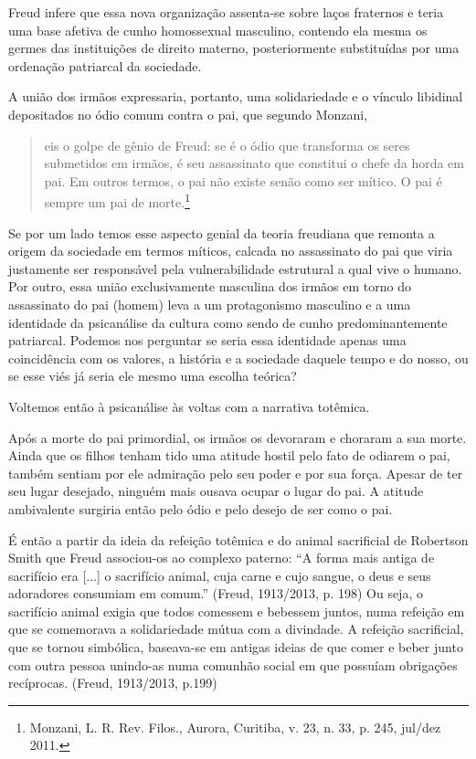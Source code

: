 Freud infere que essa nova organização assenta-se sobre laços fraternos
e teria uma base afetiva de cunho homossexual masculino, contendo ela
mesma os germes das instituições de direito materno, posteriormente
substituídas por uma ordenação patriarcal da sociedade.

A união dos irmãos expressaria, portanto, uma solidariedade e o vínculo
libidinal depositados no ódio comum contra o pai, que segundo Monzani,

\begin{quote}
eis o golpe de gênio de Freud: se é o ódio que transforma os seres
submetidos em irmãos, é seu assassinato que constitui o chefe da horda
em pai. Em outros termos, o pai não existe senão como ser mítico. O pai
é sempre um pai de morte.\footnote{Monzani, L. R. Rev. Filos., Aurora,
  Curitiba, v. 23, n. 33, p. 245, jul/dez 2011.}
\end{quote}

Se por um lado temos esse aspecto genial da teoria freudiana que remonta
a origem da sociedade em termos míticos, calcada no assassinato do pai
que viria justamente ser responsável pela vulnerabilidade estrutural a
qual vive o humano. Por outro, essa união exclusivamente masculina dos
irmãos em torno do assassinato do pai (homem) leva a um protagonismo
masculino e a uma identidade da psicanálise da cultura como sendo de
cunho predominantemente patriarcal. Podemos nos perguntar se seria essa
identidade apenas uma coincidência com os valores, a história e a
sociedade daquele tempo e do nosso, ou se esse viés já seria ele mesmo
uma escolha teórica?

Voltemos então à psicanálise às voltas com a narrativa totêmica.

Após a morte do pai primordial, os irmãos os devoraram e choraram a sua
morte. Ainda que os filhos tenham tido uma atitude hostil pelo fato de
odiarem o pai, também sentiam por ele admiração pelo seu poder e por sua
força. Apesar de ter seu lugar desejado, ninguém mais ousava ocupar o
lugar do pai. A atitude ambivalente surgiria então pelo ódio e pelo
desejo de ser como o pai.

É então a partir da ideia da refeição totêmica e do animal sacrificial
de Robertson Smith que Freud associou-os ao complexo paterno: ``A forma
mais antiga de sacrifício era {[}...{]} o sacrifício animal, cuja carne
e cujo sangue, o deus e seus adoradores consumiam em comum.'' (Freud,
1913/2013, p. 198) Ou seja, o sacrifício animal exigia que todos
comessem e bebessem juntos, numa refeição em que se comemorava a
solidariedade mútua com a divindade. A refeição sacrificial, que se
tornou simbólica, baseava-se em antigas ideias de que comer e beber
junto com outra pessoa unindo-as numa comunhão social em que possuíam
obrigações recíprocas. (Freud, 1913/2013, p.199)

